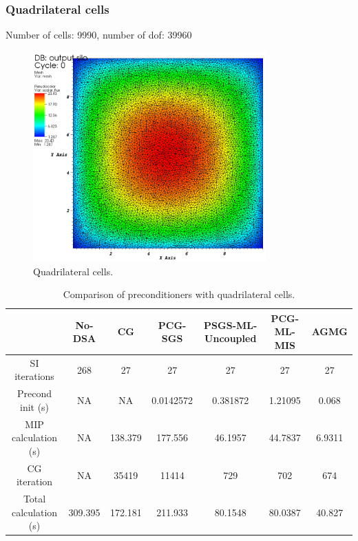 \subsubsection{Quadrilateral cells}
Number of cells: 9990, number of dof: 39960
\begin{figure}[H]
\centering
\includegraphics[width=0.8\textwidth]{homog_quad_crop}
\caption{Quadrilateral cells.}
\end{figure}
\begin{table}[H]
\begin{center}
\begin{tabular}{|c|c|c|c|c|c|c|}
\hline
 & No-DSA & CG & PCG-SGS & PSGS-ML-Uncoupled & PCG-ML-MIS & AGMG\\
\hline
SI iterations & 268 & 27 & 27 & 27 & 27 & 27 \\
Precond init (s) & NA & NA & 0.0142572 & 0.381872 & 1.21095 & 0.068\\
MIP calculation (s) & NA & 138.379 & 177.556 & 46.1957 & 44.7837 & 6.9311\\
CG iteration & NA & 35419 & 11414 & 729 & 702 & 674\\
Total calculation (s) & 309.395 & 172.181 & 211.933 & 80.1548 & 80.0387 &
40.827\\
\hline
\end{tabular}
\caption{Comparison of preconditioners with quadrilateral cells.}
\end{center}
\end{table}

